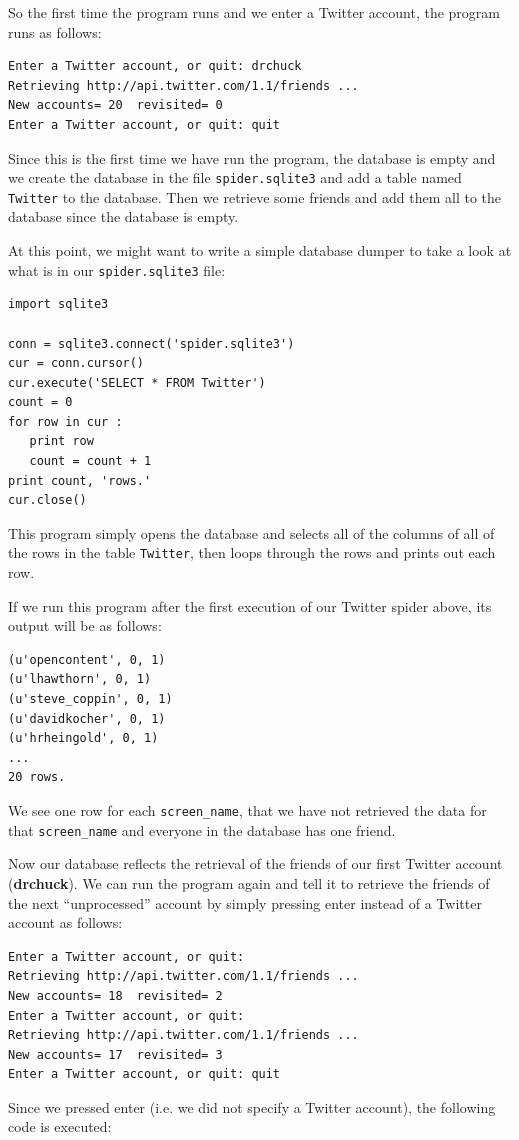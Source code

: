 \documentclass[11pt]{book}
\begin{document}
So the first time the program runs and we enter a Twitter account, the program
runs as follows:

\beforeverb
\begin{verbatim}
Enter a Twitter account, or quit: drchuck
Retrieving http://api.twitter.com/1.1/friends ...
New accounts= 20  revisited= 0
Enter a Twitter account, or quit: quit
\end{verbatim}
\afterverb
%
Since this is the first time we have run the program, the database
is empty and we create the database in the file {\tt spider.sqlite3} and
add a table named {\tt Twitter} to the database.  Then we retrieve
some friends and add them all to the database since the database is
empty.

At this point, we might want to write a simple database dumper
to take a look at what is in our {\tt spider.sqlite3} file:

\beforeverb
\begin{verbatim}
import sqlite3

conn = sqlite3.connect('spider.sqlite3')
cur = conn.cursor()
cur.execute('SELECT * FROM Twitter')
count = 0
for row in cur :
   print row
   count = count + 1
print count, 'rows.'
cur.close()
\end{verbatim}
\afterverb
%
This program simply opens the database and selects all of the 
columns of all of the rows in the table {\tt Twitter}, then 
loops through the rows and prints out each row.

If we run this program after the first execution of our Twitter
spider above, its output will be as follows:

\beforeverb
\begin{verbatim}
(u'opencontent', 0, 1)
(u'lhawthorn', 0, 1)
(u'steve_coppin', 0, 1)
(u'davidkocher', 0, 1)
(u'hrheingold', 0, 1)
...
20 rows.
\end{verbatim}
\afterverb
%
We see one row for each \verb"screen_name", that we 
have not retrieved the data for that \verb"screen_name" and 
everyone in the database has one friend.

Now our database reflects the retrieval of the friends of 
our first Twitter account ({\bf drchuck}).  We can run the program
again and tell it to retrieve the friends of the next 
``unprocessed'' account by simply pressing enter instead of
a Twitter account as follows:

\beforeverb
\begin{verbatim}
Enter a Twitter account, or quit: 
Retrieving http://api.twitter.com/1.1/friends ...
New accounts= 18  revisited= 2
Enter a Twitter account, or quit: 
Retrieving http://api.twitter.com/1.1/friends ...
New accounts= 17  revisited= 3
Enter a Twitter account, or quit: quit
\end{verbatim}
\afterverb
%
Since we pressed enter (i.e. we did not specify a Twitter account),
the following code is executed:
\end{document}
